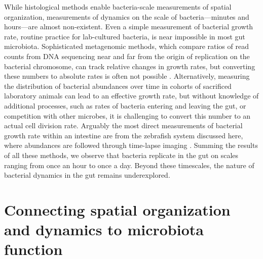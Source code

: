 While histological methods enable bacteria-scale measurements of spatial organization, measurements of dynamics on the scale of bacteria---minutes and hours---are almost non-existent. Even a simple measurement of bacterial growth rate, routine practice for lab-cultured bacteria, is near impossible in most gut microbiota. Sophisticated metagenomic methods, which compare ratios of read counts from DNA sequencing near and far from the origin of replication on the bacterial chromosome, can track relative changes in growth rates, but converting these numbers to absolute rates is often not possible \cite{korem2015growth}. Alternatively, measuring the distribution of bacterial abundances over time in cohorts of sacrificed laboratory animals can lead to an effective growth rate, but without knowledge of additional processes, such as rates of bacteria entering and leaving the gut, or competition with other microbes, it is challenging to convert this number to an actual cell division rate. Arguably the most direct measurements of bacterial growth rate within an intestine are from the zebrafish system discussed here, where abundances are followed through time-lapse imaging \cite{jemielita_spatial_2014,wiles_host_2016,schlomann_sublethal_2019}. Summing the results of all these methods, we observe that bacteria replicate in the gut on scales ranging from once an hour to once a day. Beyond these timescales, the nature of bacterial dynamics in the gut remains underexplored.

\section{Connecting spatial organization and dynamics to microbiota function}

